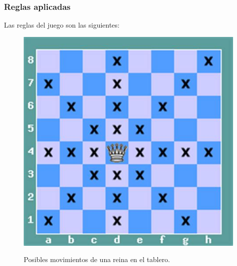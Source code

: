 \documentclass[a4paper,10pt]{article}
\begin{document}
\subsubsection{Reglas aplicadas}
Las reglas del juego son las siguientes:\\
\begin{figure}[!h]
  \centering
  \includegraphics[scale=0.25]{figures/reina.jpeg}\\
  \caption{Posibles movimientos de una reina en el tablero.}
  \label{fig:movimientos_reina}
\end{figure}
\pagebreak
\end{document}
